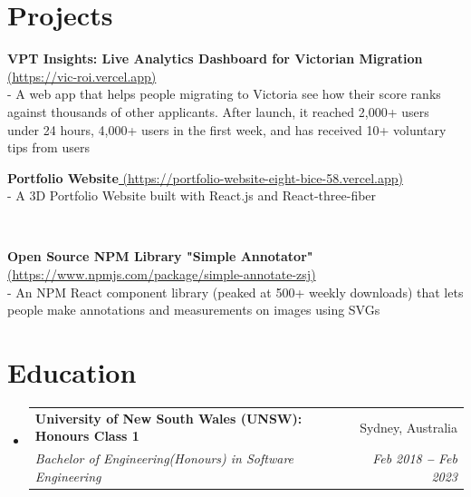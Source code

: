 \documentclass[letterpaper,11pt]{article}
\makeatletter
\newcommand{\resumeSubheading}[4]{
  \vspace{-10pt}\item
    \begin{tabular*}{0.97\textwidth}[t]{l@{\extracolsep{\fill}}r}
      \textbf{#1} & #2 \\
      \textit{\small#3} & \textit{\small #4} \\
    \end{tabular*}\vspace{0pt}
}
\newcommand{\resumeSubHeadingListStart}{\begin{itemize}[leftmargin=0.15in, label={}]}
\newcommand{\resumeSubHeadingListEnd}{\end{itemize}}
\makeatother
\begin{document}
\section{Projects}
  \vspace{6pt}
  \resumeSubHeadingListStart
    \small{\item{
        \textbf{VPT Insights: Live Analytics Dashboard for Victorian Migration}{\href{https://vic-roi.vercel.app/}{ (https://vic-roi.vercel.app)}}\\
        \vspace{2pt}
        { - A web app that helps people migrating to Victoria see how their score ranks against thousands of other applicants. After launch, it reached 2,000+ users under 24 hours, 4,000+ users in the first week, and has received 10+ voluntary tips from users } \\ \vspace{8pt}

        \textbf{Portfolio Website}{\href{https://portfolio-website-eight-bice-58.vercel.app/}{ (https://portfolio-website-eight-bice-58.vercel.app)}}\\
        \vspace{2pt}
        { - A 3D Portfolio Website built with React.js and React-three-fiber }} \\ \vspace{8pt}
        
        \textbf{Open Source NPM Library "Simple Annotator"}{\href{https://www.npmjs.com/package/simple-annotate-zsj}{ (https://www.npmjs.com/package/simple-annotate-zsj) }}\\
        \vspace{2pt}
        { - An NPM React component library (peaked at 500+ weekly downloads) that lets people make annotations and measurements on images using SVGs } \\ \vspace{8pt}
        \vspace{3pt}}
  \resumeSubHeadingListEnd



\section{Education}
  \vspace{14pt}
  \resumeSubHeadingListStart
  
    \resumeSubheading
      {University of New South Wales (UNSW): Honours Class 1}{Sydney, Australia}
      {Bachelor of Engineering(Honours) in Software Engineering}{Feb 2018 \textbf{--} Feb 2023}
    
  \resumeSubHeadingListEnd






\end{document}
